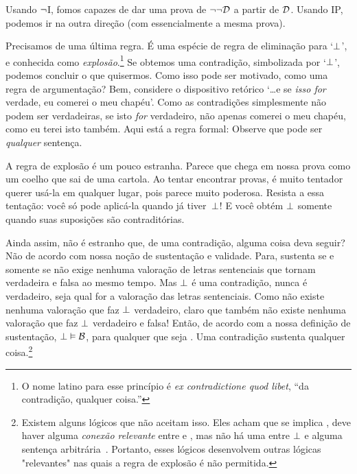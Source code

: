 Usando $\neg$I, fomos capazes de dar uma prova de $\neg\neg\mathcal{D}$ a partir de $\mathcal{D}$. Usando IP, podemos ir na outra dire\c c\~ao (com essencialmente a mesma prova).
	\begin{fitchproof}
		\open
		\close
	\end{fitchproof}

Precisamos de uma \'ultima regra. \'E uma esp\'ecie de regra de elimina\c c\~ao para `$\bot$', e conhecida como \emph{explos\~ao}.\footnote{O nome latino para esse princ\'ipio \'e  \emph{ex contradictione quod libet}, ``da contradi\c c\~ao, qualquer coisa.''}  Se obtemos uma contradi\c c\~ao, simbolizada por `$\bot$', podemos concluir o que quisermos.  Como isso pode ser motivado, como uma regra de argumenta\c c\~ao? Bem, considere o dispositivo ret\'orico `\ldots e se \emph{isso for} verdade, eu comerei o meu chap\'eu'. Como as contradi\c c\~oes simplesmente n\~ao podem ser verdadeiras, se isto \emph{for} verdadeiro, n\~ao apenas comerei o meu chap\'eu, como eu terei isto tamb\'em. Aqui est\'a a regra formal:
Observe que   pode ser \emph{qualquer} senten\c ca.

A regra de explos\~ao \'e um pouco estranha. Parece que    chega em nossa prova como um coelho que sai de uma cartola. Ao tentar encontrar provas, \'e muito tentador querer us\'a-la em qualquer lugar, pois parece muito poderosa. Resista a essa tenta\c c\~ao: voc\^e s\'o pode aplic\'a-la quando j\'a tiver~$\bot$!   E voc\^e obt\'em $\bot$   somente quando suas suposi\c c\~oes s\~ao contradit\'orias.
 

Ainda assim, n\~ao \'e estranho que, de uma contradi\c c\~ao, alguma coisa deva seguir? N\~ao de acordo com nossa no\c c\~ao de sustenta\c c\~ao e validade. Para,  sustenta  se e somente se  n\~ao exige nenhuma valora\c c\~ao de letras sentenciais que  tornam  verdadeira e  falsa ao mesmo tempo. Mas $\bot$  \'e uma contradi\c c\~ao, nunca \'e verdadeiro, seja qual for a valora\c c\~ao das letras sentenciais.  Como n\~ao existe nenhuma valora\c c\~ao que faz $\bot$ verdadeiro, claro que tamb\'em n\~ao existe nenhuma valora\c c\~ao que faz  $\bot$  verdadeiro e  falsa! Ent\~ao, de acordo com a nossa defini\c c\~ao de sustenta\c c\~ao,  $\bot \vDash \mathcal{B}$,  para qualquer que seja . Uma contradi\c c\~ao sustenta qualquer coisa.\footnote{Existem alguns l\'ogicos que n\~ao aceitam isso. Eles acham que se  implica , deve haver alguma \emph{conex\~ao relevante} entre  e , mas n\~ao h\'a uma entre $\bot$ e alguma senten\c ca arbitr\'aria~. Portanto, esses l\'ogicos desenvolvem outras l\'ogicas "relevantes" nas quais  a regra de explos\~ao \'e n\~ao permitida.}

